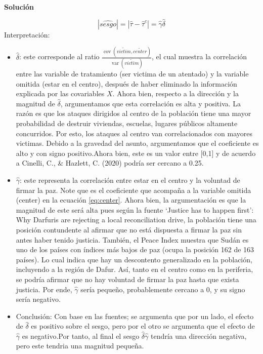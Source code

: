 \documentclass[a4paper, answers, addpoints, 11pt]{exam}
\newenvironment{solucion}{%
  \begin{mdframed}[
    backgroundcolor=blue!5,    %
    linecolor=blue!50,          %
    linewidth=2pt,              %
    leftmargin=10pt,            %
    rightmargin=8pt,           %
    topline=true,              %
    bottomline=true,            %
    roundcorner=10pt,           %
    innerleftmargin=10pt,       %
    innerrightmargin=10pt,      %
    innerbottommargin=10pt,     %
    innertopmargin=10pt         %
  ]%
  \begin{tcolorbox}[colframe=blue!50!black, colback=blue!50, coltitle=white, sharp corners=all, boxrule=1mm, width=\textwidth, halign=left, valign=center, top=0mm, bottom=0mm, left=0mm, right=0mm] \textbf{Solución} \end{tcolorbox} }{\end{mdframed}}
\begin{document}
\begin{enumerate} [resume]
    \begin{solucion}
        \begin{equation*} 
        |\hat{sesgo}| = |\hat\tau - \hat\tau^c| = \hat{\gamma} \hat{\delta}
    \end{equation*}
   Interpretación:
   \begin{itemize}
        \item $\hat{\delta}$: este corresponde al ratio $\frac{\operatorname{cov}(\tilde{victim}, \tilde{center})}{\operatorname{var}(\tilde{victim})}$, el cual muestra la correlación entre las variable de tratamiento (ser victima de un atentado) y la variable omitida (estar en el centro), después de haber eliminado la información explicada por las covariables $X$.  Ahora bien, respecto a la dirección y la magnitud de $\hat{\delta}$, argumentamos que esta correlación es alta y positiva. La razón es que los ataques dirigidos al centro de la población tiene una mayor probabilidad de destruir viviendas, escuelas, lugares públicos altamente concurridos. Por esto, los ataques al centro van correlacionados con mayores victimas. Debido a la gravedad del asunto, argumentamos que el coeficiente es alto y con signo positivo.Ahora bien, este es un valor entre [0,1] y de acuerdo a Cinelli, C., \& Hazlett, C. (2020) podría ser cercano a 0.25.
         \item $\hat{\gamma}$: este representa la correlación entre estar en el centro y la voluntad de firmar la paz. Note que es el coeficiente que acompaña a la variable omitida (center) en la ecuación \ref{eq:center}. Ahora bien, la argumentación es que la magnitud de este será alta pues según la fuente ‘Justice has to happen first’: Why Darfuris are rejecting a local reconciliation drive, la población tiene una posición contundente al afirmar que no está dispuesta a firmar la paz sin antes haber tenido justicia. También, el Peace Index muestra que Sudán es uno de los países con índices más bajos de paz (ocupa la posición 162 de 163 países). Lo cual indica que hay un descontento generalizado en la población, incluyendo a la región de Dafur. Así, tanto en el centro como en la periferia, se podría afirmar que no hay voluntad de firmar la paz hasta que exista justicia. Por ende, $\hat{\gamma}$ sería pequeño, probablemente cercano a 0, y su signo sería negativo.
          \item Conclusión: Con base en las fuentes; se argumenta que por un lado, el efecto de $\hat{\delta}$ es positivo sobre el sesgo, pero por el otro se argumenta que el efecto de $\hat{\gamma}$ es negativo.Por tanto, al final el sesgo $\hat{\delta}\hat{\gamma}$ tendría una dirección negativa, pero este tendria una magnitud pequeña.

\end{itemize}
\end{solucion}
\end{enumerate}
\end{document}
